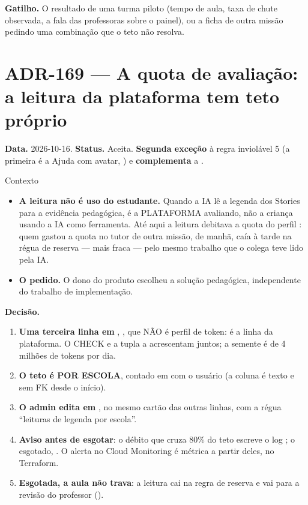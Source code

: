 \textbf{Gatilho.} O resultado de uma turma piloto (tempo de aula, taxa de
chute observada, a fala das professoras sobre o painel), ou a ficha de outra
missão pedindo uma combinação que o teto não resolva.

\section{ADR-169 --- A quota de avaliação: a leitura da plataforma tem teto próprio}
\label{adr:quota-de-avaliacao}

\textbf{Data.} 2026-10-16. \textbf{Status.} Aceita. \textbf{Segunda exceção}
à regra inviolável 5 (a primeira é a Ajuda com avatar, ) e
\textbf{complementa} a .

\begin{especificacao}{Contexto}
\begin{itemize}
  \item \textbf{A leitura não é uso do estudante.} Quando a IA lê a legenda dos
    Stories para a evidência pedagógica, é a PLATAFORMA avaliando, não a
    criança usando a IA como ferramenta. Até aqui a leitura debitava a quota do
    perfil : quem gastou a quota no tutor de outra missão, de
    manhã, caía à tarde na régua de reserva --- mais fraca --- pelo mesmo
    trabalho que o colega teve lido pela IA.
  \item \textbf{O pedido.} O dono do produto escolheu a solução pedagógica,
    independente do trabalho de implementação.
\end{itemize}
\end{especificacao}

\textbf{Decisão.}

\begin{enumerate}
  \item \textbf{Uma terceira linha em }, , que NÃO é
    perfil de token: é a linha da plataforma. O CHECK e a tupla
     a acrescentam juntos; a semente é de 4 milhões de
    tokens por dia.
  \item \textbf{O teto é POR ESCOLA}, contado em  com o
    usuário  (a coluna é texto e sem FK desde o início).
  \item \textbf{O admin edita em }, no mesmo cartão das
    outras linhas, com a régua \enquote{leituras de legenda por escola}.
  \item \textbf{Aviso antes de esgotar}: o débito que cruza 80\% do teto escreve o
    log ; o esgotado, .
    O alerta no Cloud Monitoring é métrica a partir deles, no Terraform.
  \item \textbf{Esgotada, a aula não trava}: a leitura cai na regra de reserva e
    vai para a revisão do professor ().
\end{enumerate}

